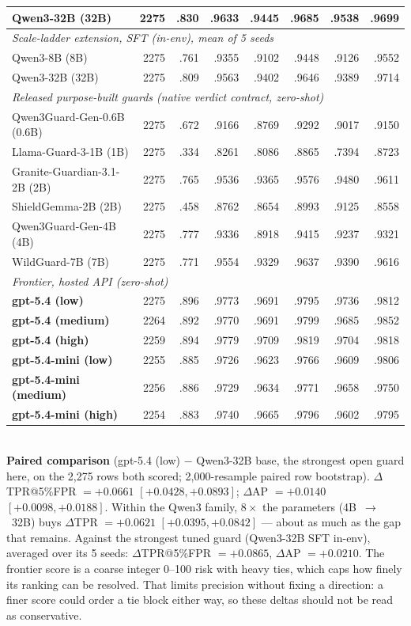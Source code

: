 \begin{table}[H]
\begin{tabular}{lrrrrrrr}
Qwen3-32B (32B) & 2275 & .830 & .9633 & .9445 & .9685 & .9538 & .9699 \\
\midrule
\multicolumn{8}{l}{\emph{Scale-ladder extension, SFT (in-env), mean of 5 seeds}} \\
Qwen3-8B (8B) & 2275 & .761 & .9355 & .9102 & .9448 & .9126 & .9552 \\
Qwen3-32B (32B) & 2275 & .809 & .9563 & .9402 & .9646 & .9389 & .9714 \\
\midrule
\multicolumn{8}{l}{\emph{Released purpose-built guards (native verdict contract, zero-shot)}} \\
Qwen3Guard-Gen-0.6B (0.6B) & 2275 & .672 & .9166 & .8769 & .9292 & .9017 & .9150 \\
Llama-Guard-3-1B (1B) & 2275 & .334 & .8261 & .8086 & .8865 & .7394 & .8723 \\
Granite-Guardian-3.1-2B (2B) & 2275 & .765 & .9536 & .9365 & .9576 & .9480 & .9611 \\
ShieldGemma-2B (2B) & 2275 & .458 & .8762 & .8654 & .8993 & .9125 & .8558 \\
Qwen3Guard-Gen-4B (4B) & 2275 & .777 & .9336 & .8918 & .9415 & .9237 & .9321 \\
WildGuard-7B (7B) & 2275 & .771 & .9554 & .9329 & .9637 & .9390 & .9616 \\
\midrule
\multicolumn{8}{l}{\emph{Frontier, hosted API (zero-shot)}} \\
\textbf{gpt-5.4 (low)} & 2275 & .896 & .9773 & .9691 & .9795 & .9736 & .9812 \\
\textbf{gpt-5.4 (medium)} & 2264 & .892 & .9770 & .9691 & .9799 & .9685 & .9852 \\
\textbf{gpt-5.4 (high)} & 2259 & .894 & .9779 & .9709 & .9819 & .9704 & .9818 \\
\textbf{gpt-5.4-mini (low)} & 2255 & .885 & .9726 & .9623 & .9766 & .9609 & .9806 \\
\textbf{gpt-5.4-mini (medium)} & 2256 & .886 & .9729 & .9634 & .9771 & .9658 & .9750 \\
\textbf{gpt-5.4-mini (high)} & 2254 & .883 & .9740 & .9665 & .9796 & .9602 & .9795 \\
\bottomrule
\end{tabular}\\[3pt]{\footnotesize \textbf{Paired comparison} (gpt-5.4 (low) $-$ Qwen3-32B base, the strongest open guard here, on the 2,275 rows both scored; 2,000-resample paired row bootstrap). $\Delta$TPR@5\%FPR $= +0.0661$ $[+0.0428, +0.0893]$; $\Delta$AP $= +0.0140$ $[+0.0098, +0.0188]$. Within the Qwen3 family, $8\times$ the parameters (4B~$\to$~32B) buys $\Delta$TPR $= +0.0621$ $[+0.0395, +0.0842]$ --- about as much as the gap that remains. Against the strongest tuned guard (Qwen3-32B SFT in-env), averaged over its 5 seeds: $\Delta$TPR@5\%FPR $= +0.0865$, $\Delta$AP $= +0.0210$. The frontier score is a coarse integer 0--100 risk with heavy ties, which caps how finely its ranking can be resolved. That limits precision without fixing a direction: a finer score could order a tie block either way, so these deltas should not be read as conservative.}
\end{table}
